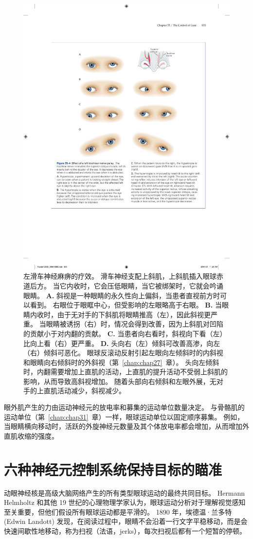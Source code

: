 \begin{figure}[htbp]
	\centering
	\includegraphics[width=0.5\linewidth]{chap35/fig_35_4}
	\caption{左滑车神经麻痹的疗效。
		滑车神经支配上斜肌，上斜肌插入眼球赤道后方。
		当它内收时，它会压低眼睛，当它被绑架时，它就会吟诵眼睛。
		\textbf{A.} 斜视是一种眼睛的永久性向上偏斜，当患者直视前方时可以看到。
		右眼位于眼眶中心，但受影响的左眼略高于右眼。
		\textbf{B.} 当眼睛内收时，由于无对手的下斜肌将眼睛推高（左），因此斜视更严重。
		当眼睛被诱拐（右）时，情况会得到改善，因为上斜肌对凹陷的贡献小于对内翻的贡献。
		\textbf{C.} 当患者向右看时，斜视向下看（左）比向上看（右）更严重。
		\textbf{D.} 头向右（左）倾斜可改善高渗，向左（右）倾斜可恶化。
		眼球反滚动反射引起左眼向左倾斜时的内斜视和眼睛向右倾斜时的外斜视（第~\ref{chap:chap27}~章）。
		头向左倾斜时，内翻需要增加上直肌的活动，上直肌的提升活动不受弱上斜肌的影响，从而导致高斜视增加。
		随着头部向右倾斜和左眼外展，无对手的上直肌活动减少，斜视减少。}
	\label{fig:35_4}
\end{figure}


眼外肌产生的力由运动神经元的放电率和募集的运动单位数量决定。
与骨骼肌的运动单位（第~\ref{chap:chap31}~章）一样，眼球运动单位以固定顺序募集。
例如，当眼睛横向移动时，活跃的外旋神经元数量及其个体放电率都会增加，从而增加外直肌收缩的强度。



\section{六种神经元控制系统保持目标的瞄准}

动眼神经核是高级大脑网络产生的所有类型眼球运动的最终共同目标。
Hermann Helmholtz 和其他 19 世纪的心理物理学家认为，眼球运动分析对于理解视觉感知至关重要，但他们假设所有眼球运动都是平滑的。
1890 年，埃德温·兰多特 (Edwin Landott) 发现，在阅读过程中，眼睛不会沿着一行文字平稳移动，而是会快速间歇性地移动，称为扫视（法语，jerks），每次扫视后都有一个短暂的停顿。


